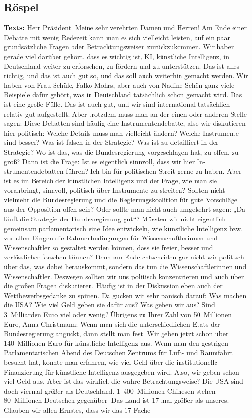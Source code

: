 \documentclass{article}
\begin{document}
\subsection{Röspel}
\noindent\textbf{Texts:} Herr Präsident! Meine sehr verehrten Damen und Herren! Am Ende einer Debatte mit wenig Redezeit kann man es sich vielleicht leisten, auf ein paar grundsätzliche Fragen oder Betrachtungsweisen zurückzukommen. Wir haben gerade viel darüber gehört, dass es wichtig ist, KI, künstliche Intelligenz, in Deutschland weiter zu erforschen, zu fördern und zu unterstützen. Das ist alles richtig, und das ist auch gut so, und das soll auch weiterhin gemacht werden. Wir haben von Frau Schüle, Falko Mohrs, aber auch von Nadine Schön ganz viele Beispiele dafür gehört, was in Deutschland tatsächlich schon gemacht wird. Das ist eine große Fülle. Das ist auch gut, und wir sind international tatsächlich relativ gut aufgestellt. Aber trotzdem muss man an der einen oder anderen Stelle sagen: Diese Debatten sind häufig eine Instrumentendebatte, also wir diskutieren hier politisch: Welche Details muss man vielleicht ändern? Welche Instrumente sind besser? Was ist falsch in der Strategie? Was ist zu detailliert in der Strategie? Wo ist das, was die Bundesregierung vorgeschlagen hat, zu offen, zu groß? Dann ist die Frage: Ist es eigentlich sinnvoll, dass wir hier In­strumentendebatten führen? Ich bin für politischen Streit gerne zu haben. Aber ist es im Bereich der künstlichen Intelligenz und der Frage, wie man sie voranbringt, sinnvoll, politisch über Instrumente zu streiten?  Sollten nicht vielmehr die Bundesregierung und die Regierungskoalition für gute Vorschläge aus der Opposition offen sein? Oder sollte man nicht auch umgekehrt sagen: „Da läuft die Strategie der Bundesregierung gut“? Müssten wir nicht eigentlich gemeinsam parlamentarisch eine Idee entwickeln, wie künstliche Intelligenz bzw. vor allen Dingen die Rahmenbedingungen für Wissenschaftlerinnen und Wissenschaftler so gestaltet werden können, dass sie freier, besser und verlässlicher forschen können?  Denn am Ende entscheiden gar nicht wir politisch über das, was dabei herauskommt, sondern das tun die Wissenschaftlerinnen und Wissenschaftler. Deswegen sollten wir uns politisch konzentrieren und auch über die großen Fragen diskutieren. Häufig ist in der Diskussion eben auch der Wettbewerbsgedanke zu spüren. Da gucken wir sehr panisch darauf: Was machen die USA? Wie viel Geld geben sie dafür aus? Was geben wir aus? Sind 3 Milliarden Euro viel oder wenig? Übrigens zu Ihrer Zahl von 50 Millionen Euro, Anna Christmann: Wenn man sich die unterschiedlichen Etats der Bundesregierung anguckt, dann stellt man fest: Wir geben jetzt schon über 140 Millionen Euro für künstliche Intelligenz aus. Wenn man den gestrigen Parlamentarischen Abend des Deutschen Zentrums für Luft- und Raumfahrt besucht hat, konnte man erfahren, wie viel Geld über die institutionelle Finanzierung für künstliche Intelligenz ausgegeben wird. Also, wir geben schon viel Geld aus. Aber ist das wirklich die wahre Betrachtungsweise? Die USA sind doch viermal größer als Deutschland. 1 400 Millionen Chinesen stehen 80 Millionen Deutschen gegenüber. Das Land ist 17‑mal größer als unseres. Glauben wir allen Ernstes, dass wir das 17‑Fache 
\end{document}
